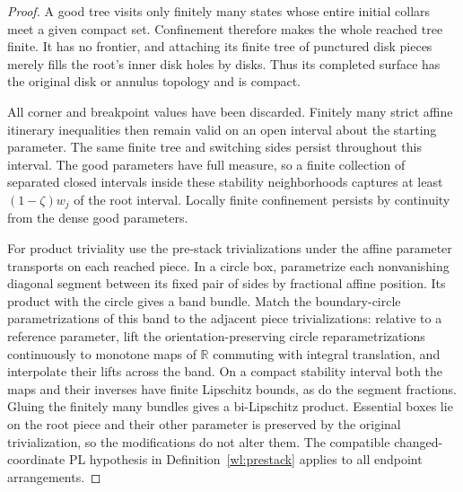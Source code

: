 \documentclass[11pt]{article}
\numberwithin{equation}{section}
\theoremstyle{definition}
\theoremstyle{remark}
\begin{document}
\begin{proof}
A good tree visits only finitely many states whose entire initial
collars meet a given compact set.  Confinement therefore makes the
whole reached tree finite.  It has no frontier, and attaching its
finite tree of punctured disk pieces merely fills the root's inner
disk holes by disks.  Thus its completed surface has the original
disk or annulus topology and is compact.

All corner and breakpoint values have been discarded.  Finitely
many strict affine itinerary inequalities then remain valid on an
open interval about the starting parameter.  The same finite tree
and switching sides persist throughout this interval.  The good
parameters have full measure, so a finite collection of separated
closed intervals inside these stability neighborhoods captures at
least $(1-\zeta)w_j$ of the root interval.  Locally finite confinement
persists by continuity from the dense good parameters.

For product triviality use the pre-stack trivializations under the
affine parameter transports on each reached piece.  In a circle
box, parametrize each nonvanishing diagonal segment between its
fixed pair of sides by fractional affine position.  Its product
with the circle gives a band bundle.  Match the boundary-circle
parametrizations of this band to the adjacent piece
trivializations: relative to a reference parameter, lift the
orientation-preserving circle reparametrizations continuously to
monotone maps of $\mathbb R$ commuting with integral translation, and
interpolate their lifts across the band.  On a compact stability
interval both the maps and their inverses have finite Lipschitz
bounds, as do the segment fractions.  Gluing the finitely many
bundles gives a bi-Lipschitz product.  Essential boxes lie on the
root piece and their other parameter is preserved by the original
trivialization, so the modifications do not alter them.  The
compatible changed-coordinate PL hypothesis in
Definition~\ref{wl:prestack} applies to all endpoint arrangements.
\end{proof}
\end{document}

